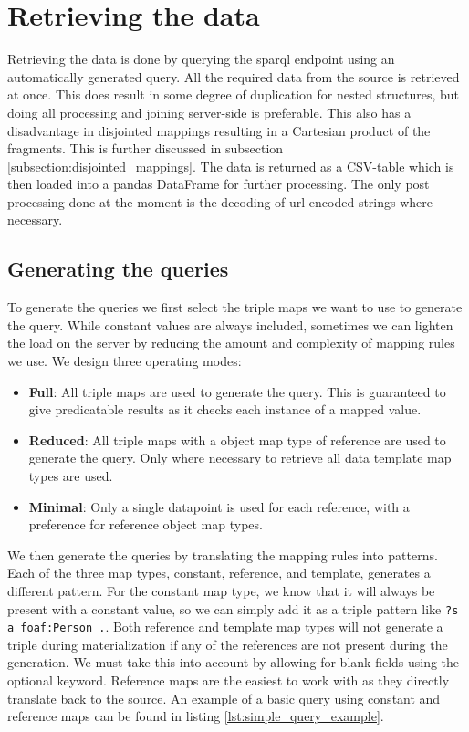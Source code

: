 \section{Retrieving the data}
\label{section:retrieving_data}
Retrieving the data is done by querying the \acrshort{sparql} endpoint using an automatically generated query. All the required data from the source is retrieved at once. This does result in some degree of duplication for nested structures, but doing all processing and joining server-side is preferable. This also has a disadvantage in disjointed mappings resulting in a Cartesian product of the fragments. This is further discussed in subsection \ref{subsection:disjointed_mappings}. The data is returned as a CSV-table which is then loaded into a pandas DataFrame for further processing. The only post processing done at the moment is the decoding of url-encoded strings where necessary. 

\subsection{Generating the queries}
\label{subsection:generating_queries}
To generate the queries we first select the triple maps we want to use to generate the query. While constant values are always included, sometimes we can lighten the load on the server by reducing the amount and complexity of mapping rules we use. We design three operating modes:
\begin{itemize}
    \item \textbf{Full}: All triple maps are used to generate the query. This is guaranteed to give predicatable results as it checks each instance of a mapped value.
    \item \textbf{Reduced}: All triple maps with a object map type of reference are used to generate the query. Only where necessary to retrieve all data template map types are used.
    \item \textbf{Minimal}: Only a single datapoint is used for each reference, with a preference for reference object map types.
\end{itemize}

We then generate the queries by translating the mapping rules into patterns. 
Each of the three map types, constant, reference, and template, generates a different pattern.
For the constant map type, we know that it will always be present with a constant value, so we can simply add it as a triple pattern like \texttt{?s a foaf:Person .}. 
Both reference and template map types will not generate a triple during materialization if any of the references are not present during the generation. We must take this into account by allowing for blank fields using the optional keyword.
Reference maps are the easiest to work with as they directly translate back to the source. An example of a basic query using constant and reference maps can be found in listing \ref{lst:simple_query_example}.

